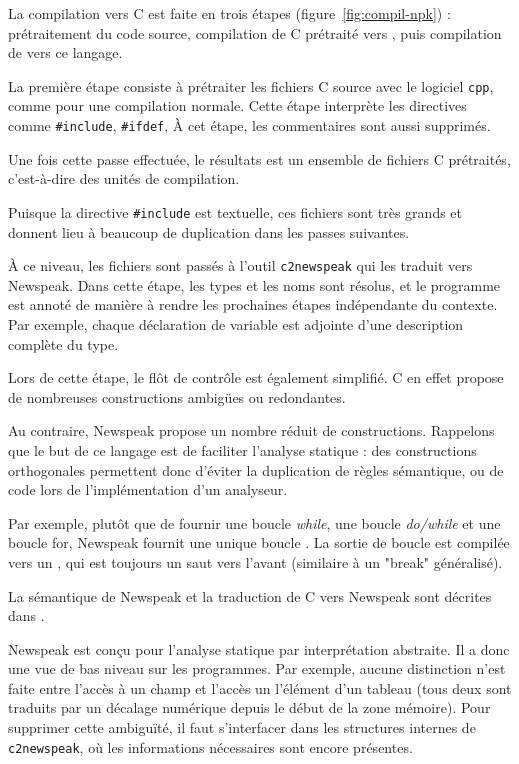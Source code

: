 
La compilation vers C est faite en trois étapes (figure~\ref{fig:compil-npk}) :
prétraitement du code source, compilation de C prétraité vers \newspeak{}, puis
compilation de \newspeak{} vers ce langage.

La première étape consiste à prétraiter les fichiers C source avec le logiciel
\texttt{cpp}, comme pour une compilation normale. Cette étape interprète les
directives comme \texttt{\#include}, \texttt{\#ifdef}, À cet étape, les
commentaires sont aussi supprimés.


Une fois cette passe effectuée, le résultats est un ensemble de fichiers C
prétraités, c'est-à-dire des unités de compilation.

Puisque la directive \texttt{\#include} est textuelle, ces fichiers sont très
grands et donnent lieu à beaucoup de duplication dans les passes suivantes.

À ce niveau, les fichiers sont passés à l'outil \texttt{c2newspeak} qui les
traduit vers Newspeak. Dans cette étape, les types et les noms sont résolus, et
le programme est annoté de manière à rendre les prochaines étapes indépendante
du contexte. Par exemple, chaque déclaration de variable est adjointe d'une
description complète du type.

Lors de cette étape, le flôt de contrôle est également simplifié. C en effet
propose de nombreuses constructions ambigües ou redondantes.

Au contraire, Newspeak propose un nombre réduit de constructions. Rappelons que
le but de ce langage est de faciliter l'analyse statique : des constructions
orthogonales permettent donc d'éviter la duplication de règles sémantique, ou de
code lors de l'implémentation d'un analyseur.

Par exemple, plutôt que de fournir une boucle \emph{while}, une boucle
\emph{do/while} et une boucle for, Newspeak fournit une unique boucle
\npkWhile{}. La sortie de boucle est compilée vers un \npkGoto{}\cite{goto}, qui est
toujours un saut vers l'avant (similaire à un "break" généralisé).

La sémantique de Newspeak et la traduction de C vers Newspeak sont décrites dans
\cite{newspeak}.

Newspeak est conçu pour l'analyse statique par interprétation abstraite. Il a
donc une vue de bas niveau sur les programmes. Par exemple, aucune distinction
n'est faite entre l'accès à un champ et l'accès un l'élément d'un tableau (tous
deux sont traduits par un décalage numérique depuis le début de la zone
mémoire). Pour supprimer cette ambiguïté, il faut s'interfacer dans les
structures internes de \texttt{c2newspeak}, où les informations nécessaires sont
encore présentes.

